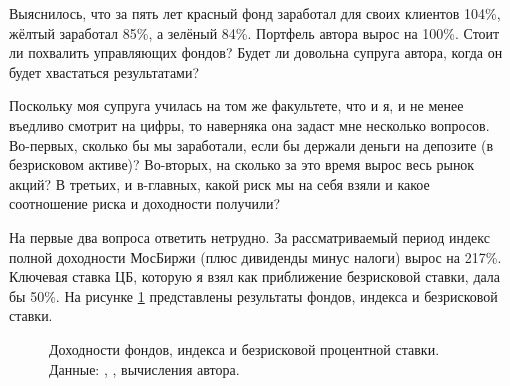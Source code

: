 Выяснилось, что за пять лет красный фонд заработал для своих клиентов 104\%, 
жёлтый заработал 85\%, а зелёный 84\%. Портфель автора вырос на 100\%. Стоит ли 
похвалить управляющих фондов? Будет ли довольна супруга автора, когда он будет 
хвастаться результатами?

Поскольку моя супруга училась на том же факультете, что и я, и не менее въедливо 
смотрит на цифры, то наверняка она задаст мне несколько вопросов. Во-первых, 
сколько бы мы заработали, если бы держали деньги на депозите (в безрисковом 
активе)? Во-вторых, на сколько за это время вырос весь рынок акций? В третьих, и 
в-главных, какой риск мы на себя взяли и какое соотношение риска и доходности 
получили?

На первые два вопроса ответить нетрудно. За рассматриваемый период индекс  
полной доходности МосБиржи (плюс дивиденды минус налоги) вырос на 217\%. 
Ключевая ставка ЦБ, которую я взял как приближение безрисковой ставки, дала бы 
50\%. На рисунке \ref{fund_total_growth_figure} представлены результаты фондов, 
индекса и безрисковой ставки.

\begin{figure}[h]
\centering
{}

\caption{Доходности фондов, индекса и безрисковой процентной ставки. Данные: 
\cite{moex2020}, \cite{cbr2020}, вычисления автора.}
\label{fund_total_growth_figure}
\end{figure}


